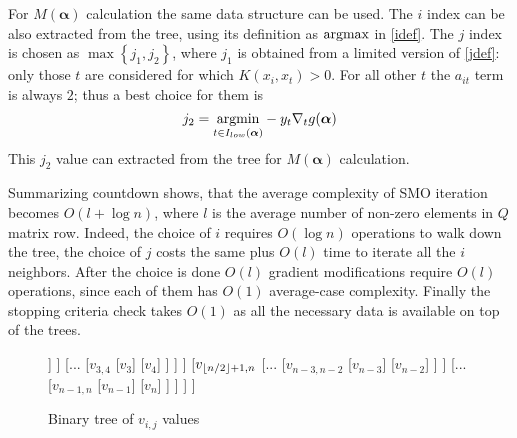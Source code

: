 For $M(\bm{\alpha})$ calculation the same data structure can be used. The $i$ index can be also extracted from the tree, using its definition as $\operatorname{argmax}$ in \ref{idef}. The $j$ index is chosen as $\max\left\{j_1, j_2\right\}$, where $j_1$ is obtained 
from a limited version of \ref{jdef}: only those $t$ are considered for which $K(x_i, x_t) > 0$. For all other $t$ the $a_{it}$ term is always $2$; thus a best choice for them is
\begin{equation}
j_2 = \underset{t \in I_{low}(\bm{\alpha})}{\operatorname{argmin}} -y_t \nabla_t g(\bm{\alpha})
\end{equation}
This $j_2$ value can extracted from the tree for $M(\bm{\alpha})$ calculation.

Summarizing countdown shows, that the average complexity of SMO iteration becomes $O(l + \log n)$, where $l$ is the average number of non-zero elements in $Q$ matrix row. Indeed, the choice of $i$ requires
$O(\log n)$ operations to walk down the tree, the choice of $j$ costs the same plus $O(l)$ time to iterate all the $i$ neighbors. After the choice is done $O(l)$ gradient modifications require $O(l)$ operations, since each of them has $O(1)$ average-case complexity. Finally the stopping criteria check takes $O(1)$ as all the necessary data is available on top of the trees.

\begin{figure}
\centering
\begin{forest}
[$v_{1,n}$, 
	[$v_{1,\Floor{n/2}}$
		[...
			[$v_{1,2}$
				[$v_1$]
				[$v_2$]
			]
		]
		[...
			[$v_{3,4}$
				[$v_3$]
				[$v_4$]
			]
		]
	]
	[$v_{\lfloor n/2 \rfloor+1							,n}$
		[...
			[$v_{n-3,n-2}$
				[$v_{n-3}$]
				[$v_{n-2}$]
			]
		]
		[...
			[$v_{n-1,n}$
				[$v_{n-1}$]
				[$v_{n}$]
			]
		]
	]
]
\end{forest}
\caption{Binary tree of $v_{i,j}$ values}
\label{vtree}
\end{figure}

